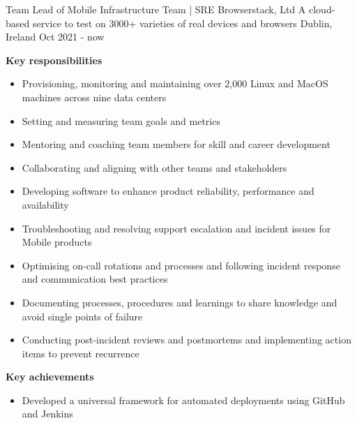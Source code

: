 

\begin{cventries}

    \cventry
    {Team Lead of Mobile Infrastructure Team | SRE} %
    {Browserstack, Ltd \textnormal{A cloud-based service to test on 3000+ varieties of real devices and browsers}} %
    {Dublin, Ireland} %
    {Oct 2021 - now} %
    {
        \textbf{Key responsibilities}
        \begin{itemize}
            \item {Provisioning, monitoring and maintaining over 2,000 Linux and MacOS machines across nine data centers}
            \item {Setting and measuring team goals and metrics}
            \item {Mentoring and coaching team members for skill and career development}
            \item {Collaborating and aligning with other teams and stakeholders}
            \item {Developing software to enhance product reliability, performance and availability}
            \item {Troubleshooting and resolving support escalation and incident issues for Mobile products}
            \item {Optimising on-call rotations and processes and following incident response and communication best practices}
            \item {Documenting processes, procedures and learnings to share knowledge and avoid single points of failure}
            \item {Conducting post-incident reviews and postmortems and implementing action items to prevent recurrence}
        \end{itemize}
        \textbf{Key achievements}
        \begin{itemize}
            \item {Developed a universal framework for automated deployments using GitHub and Jenkins}

\end{itemize}}
\end{cventries}
